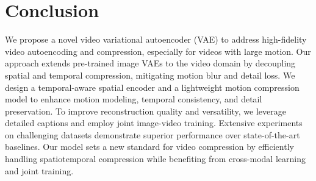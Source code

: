 \section{Conclusion}
We propose a novel video variational autoencoder (VAE) to address high-fidelity video autoencoding and compression, especially for videos with large motion. 
Our approach extends pre-trained image VAEs to the video domain by decoupling spatial and temporal compression, mitigating motion blur and detail loss. 
We design a temporal-aware spatial encoder and a lightweight motion compression model to enhance motion modeling, temporal consistency, and detail preservation. 
To improve reconstruction quality and versatility, we leverage detailed captions and employ joint image-video training. Extensive experiments on challenging datasets demonstrate superior performance over state-of-the-art baselines. 
Our model sets a new standard for video compression by efficiently handling spatiotemporal compression while benefiting from cross-modal learning and joint training.